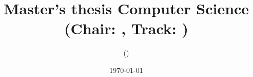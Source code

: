 \begin{titlepage}
\title{Master's thesis Computer Science\\ (Chair: \myDepartment, Track: \myTrack)}
\course{\myTitle}
\subtitle{\mySubtitle}
\university{\myUni}
\faculty{\myFaculty}
\author{\myName (\myStudNum)}


\committee{
\myProf (\myProfAffil)\\
\myOtherProf (\myOtherProfAffil)\\
\mySupervisor (\mySupervisorAffil)\\
}	
\date{\today}
\num{}

\supervisors{
\myProf (\myProfAffil)\\
\mySupervisor (\mySupervisorAffil)
}    
\end{titlepage}
\maketitle
\clearpage